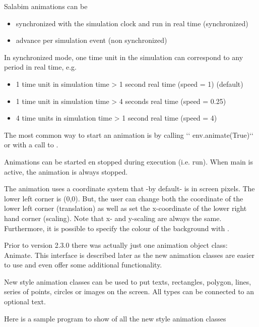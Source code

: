 \documentclass[letterpaper,10pt,english]{sphinxmanual}
\begin{document}
Salabim animations can be
\begin{itemize}
\item {} 
synchronized with the simulation clock and run in real time (synchronized)

\item {} 
advance per simulation event (non synchronized)

\end{itemize}

In synchronized mode, one time unit in the simulation can correspond to any period in real time, e.g.
\begin{itemize}
\item {} 
1 time unit in simulation time \textendash{}\textgreater{} 1 second real time (speed = 1) (default)

\item {} 
1 time unit in simulation time \textendash{}\textgreater{} 4 seconds real time (speed = 0.25)

\item {} 
4 time units in simulation time \textendash{}\textgreater{} 1 second real time (speed = 4)

\end{itemize}

The most common way to start an animation is by calling
{}`{}` env.animate(True){}`{}` or with a call to .

Animations can be started en stopped during execution (i.e. run). When main is active, the animation
is always stopped.

The animation uses a coordinate system that -by default- is in screen pixels. The lower left corner is (0,0).
But, the user can change both the coordinate of the lower left corner (translation) as well as set the x-coordinate
of the lower right hand corner (scaling). Note that x- and y-scaling are always the same. 
Furthermore, it is possible to specify the colour of the background with .

Prior to version 2.3.0 there was actually just one animation object class: Animate. This
interface is described later as the new animation classes are easier to use and even offer some
additional functionality.

New style animation classes can be used to put texts, rectangles, polygon, lines, series of points, circles
or images on the screen. All types can be connected to an optional text.

Here is a sample program to show of all the new style animation classes
\end{document}
